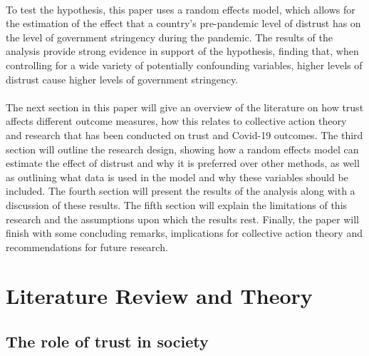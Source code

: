 \documentclass[
  12pt,
]{article}
\begin{document}
~\\
To test the hypothesis, this paper uses a random effects model, which allows for the estimation of the effect that a country's pre-pandemic level of distrust has on the level of government stringency during the pandemic. The results of the analysis provide strong evidence in support of the hypothesis, finding that, when controlling for a wide variety of potentially confounding variables, higher levels of distrust cause higher levels of government stringency.\\
~\\
The next section in this paper will give an overview of the literature on how trust affects different outcome measures, how this relates to collective action theory and research that has been conducted on trust and Covid-19 outcomes. The third section will outline the research design, showing how a random effects model can estimate the effect of distrust and why it is preferred over other methods, as well as outlining what data is used in the model and why these variables should be included. The fourth section will present the results of the analysis along with a discussion of these results. The fifth section will explain the limitations of this research and the assumptions upon which the results rest. Finally, the paper will finish with some concluding remarks, implications for collective action theory and recommendations for future research.\\

\hypertarget{literature-review-and-theory}{%
\section{Literature Review and Theory}\label{literature-review-and-theory}}

\hypertarget{the-role-of-trust-in-society}{%
\subsection{The role of trust in society}\label{the-role-of-trust-in-society}}
\end{document}

